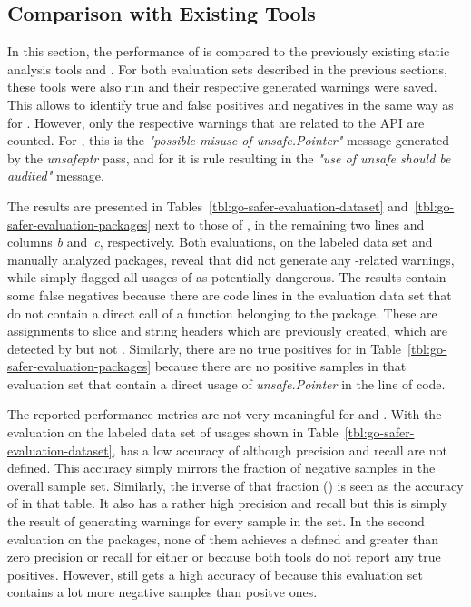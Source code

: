 
\subsection{Comparison with Existing Tools}\label{subsec:go-safer:evaluation:linters-comparison}

In this section, the performance of \toolSafer{} is compared to the previously existing static analysis tools \toolVet{}
and \toolGosec{}.
For both evaluation sets described in the previous sections, these tools were also run and their respective generated
warnings were saved.
This allows to identify true and false positives and negatives in the same way as for \toolSafer{}.
However, only the respective warnings that are related to the \unsafe{} \acrshort{API} are counted.
For \toolVet{}, this is the \textit{"possible misuse of unsafe.Pointer"} message generated by the \textit{unsafeptr}
pass, and for \toolGosec{} it is rule  resulting in the \textit{"use of unsafe should be
audited"} message.

The results are presented in Tables~\ref{tbl:go-safer-evaluation-dataset} and~\ref{tbl:go-safer-evaluation-packages}
next to those of \toolSafer{}, in the remaining two lines and columns \textit{b} and~\textit{c}, respectively.
Both evaluations, on the labeled data set and  manually analyzed packages, reveal that \toolVet{} did not
generate any \unsafe{}-related warnings, while \toolGosec{} simply flagged all usages of \unsafe{} as potentially
dangerous.
The \toolGosec{} results contain some false negatives because there are code lines in the evaluation data set that do
not contain a direct call of a function belonging to the \unsafe{} package.
These are assignments to slice and string headers which are previously created, which are detected by \toolSafer{} but
not \toolGosec{}.
Similarly, there are no true positives for \toolGosec{} in Table~\ref{tbl:go-safer-evaluation-packages} because there
are no positive samples in that evaluation set that contain a direct usage of \textit{unsafe.Pointer} in the line of
code.

The reported performance metrics are not very meaningful for \toolVet{} and \toolGosec{}.
With the evaluation on the labeled data set of \unsafe{} usages shown in Table~\ref{tbl:go-safer-evaluation-dataset},
\toolVet{} has a low accuracy of  although precision and recall are not defined.
This accuracy simply mirrors the fraction of negative samples in the overall sample set.
Similarly, the inverse of that fraction () is seen as the accuracy of \toolGosec{} in that table.
It also has a rather high precision and recall but this is simply the result of generating warnings for every sample in
the set.
In the second evaluation on the  packages, none of them achieves a defined and greater than zero precision
or recall for either \toolVet{} or \toolGosec{} because both tools do not report any true positives.
However, \toolVet{} still gets a high accuracy of  because this evaluation set contains a lot more
negative samples than positve ones.

